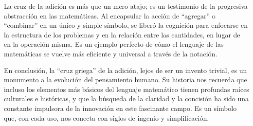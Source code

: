 \documentclass[11pt, a4paper]{article} %
\begin{document}
La cruz de la adición es más que un mero atajo; es un testimonio de la progresiva abstracción en las matemáticas. Al encapsular la acción de ``agregar'' o ``combinar'' en un único y simple símbolo, se liberó la cognición para enfocarse en la estructura de los problemas y en la relación entre las cantidades, en lugar de en la operación misma. Es un ejemplo perfecto de cómo el lenguaje de las matemáticas se vuelve más eficiente y universal a través de la notación.

En conclusión, la ``cruz griega'' de la adición, lejos de ser un invento trivial, es un monumento a la evolución del pensamiento humano. Su historia nos recuerda que incluso los elementos más básicos del lenguaje matemático tienen profundas raíces culturales e históricas, y que la búsqueda de la claridad y la concisión ha sido una constante impulsora de la innovación en este fascinante campo. Es un símbolo que, con cada uso, nos conecta con siglos de ingenio y simplificación.
\end{document}
